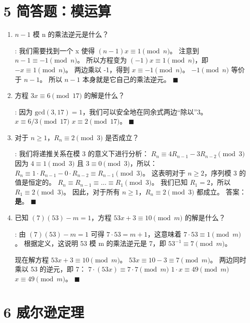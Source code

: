 \documentclass[11pt]{article}
\newenvironment{qparts}{\begin{enumerate}[{(}a{)}]}{\end{enumerate}}
\def\endproofmark{$\blacksquare$}
\newenvironment{proof}{\par\noindent{\bf 证明}:}{\endproofmark\smallskip}
\begin{document}
\section*{5 简答题：模运算}
\begin{qparts}
\item $n-1$ 模 n 的乘法逆元是什么？
\begin{proof}
我们需要找到一个 x 使得 $(n-1)x \equiv 1 \pmod n$。
注意到 $n-1 \equiv -1 \pmod n$。
所以方程变为 $(-1)x \equiv 1 \pmod n$，即 $-x \equiv 1 \pmod n$。
两边乘以 -1，得到 $x \equiv -1 \pmod n$。
$-1 \pmod n$ 等价于 $n-1$。
所以 $n-1$ 本身就是它自己的乘法逆元。
\end{proof}

\item 方程 $3x\equiv6 \pmod{17}$ 的解是什么？
\begin{proof}
因为 $\text{gcd}(3, 17) = 1$，我们可以安全地在同余式两边“除以”3。
$x \equiv 6/3 \pmod{17}$
$x \equiv 2 \pmod{17}$。
\end{proof}

\item 对于 $n\ge1$，$R_{n}\equiv2 \pmod{3}$ 是否成立？
\begin{proof}
我们将递推关系在模 3 的意义下进行分析：
$R_n \equiv 4R_{n-1} - 3R_{n-2} \pmod{3}$
因为 $4 \equiv 1 \pmod 3$ 且 $3 \equiv 0 \pmod 3$，所以：
$R_n \equiv 1 \cdot R_{n-1} - 0 \cdot R_{n-2} \equiv R_{n-1} \pmod 3$。
这表明对于 $n \ge 2$，序列模 3 的值是恒定的。
$R_n \equiv R_{n-1} \equiv \dots \equiv R_1 \pmod 3$。
我们已知 $R_1=2$，所以 $R_1 \equiv 2 \pmod 3$。
因此，对于所有 $n \ge 1$，$R_n \equiv 2 \pmod 3$ 都成立。
答案：\textbf{是}。
\end{proof}

\item 已知 $(7)(53)-m=1$，方程 $53x+3\equiv10 \pmod{m}$ 的解是什么？
\begin{proof}
由 $(7)(53)-m=1$ 可得 $7 \cdot 53 = m+1$，这意味着 $7 \cdot 53 \equiv 1 \pmod m$。
根据定义，这说明 53 模 m 的乘法逆元是 7，即 $53^{-1} \equiv 7 \pmod m$。

现在解方程 $53x+3 \equiv 10 \pmod m$。
$53x \equiv 10-3 \equiv 7 \pmod m$。
两边同时乘以 53 的逆元，即 7：
$7 \cdot (53x) \equiv 7 \cdot 7 \pmod m$
$1 \cdot x \equiv 49 \pmod m$
$x \equiv 49 \pmod m$。
\end{proof}
\end{qparts}

\section*{6 威尔逊定理}
\end{document}
